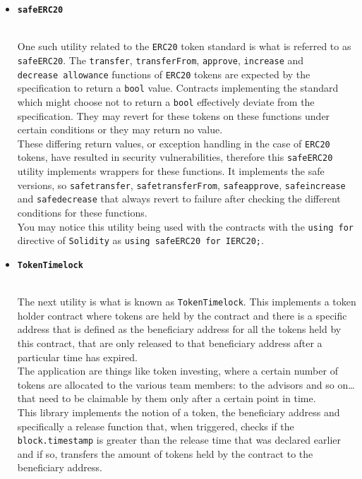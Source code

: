 \begin{itemize}
\item
  \textbf{\texttt{safeERC20}}\strut \\

  One such utility related to the \texttt{ERC20} token standard is what
  is referred to as \texttt{safeERC20}. The \texttt{transfer},
  \texttt{transferFrom}, \texttt{approve}, \texttt{increase} and
  \texttt{decrease\ allowance} functions of \texttt{ERC20} tokens are
  expected by the specification to return a \texttt{bool} value.
  Contracts implementing the standard which might choose not to return a
  \texttt{bool} effectively deviate from the specification. They may
  revert for these tokens on these functions under certain conditions or
  they may return no value.\\

  These differing return values, or exception handling in the case of
  \texttt{ERC20} tokens, have resulted in security vulnerabilities,
  therefore this \texttt{safeERC20} utility implements wrappers for
  these functions. It implements the safe versions, so
  \texttt{safetransfer}, \texttt{safetransferFrom},
  \texttt{safeapprove}, \texttt{safeincrease} and \texttt{safedecrease}
  that always revert to failure after checking the different conditions
  for these functions.\\

  You may notice this utility being used with the contracts with the
  \texttt{using\ for} directive of \texttt{Solidity} as
  \texttt{using\ safeERC20\ for\ IERC20;}.
\item
  \textbf{\texttt{TokenTimelock}}\strut \\

  The next utility is what is known as \texttt{TokenTimelock}. This
  implements a token holder contract where tokens are held by the
  contract and there is a specific address that is defined as the
  beneficiary address for all the tokens held by this contract, that are
  only released to that beneficiary address after a particular time has
  expired.\\

  The application are things like token investing, where a certain
  number of tokens are allocated to the various team members: to the
  advisors and so on\ldots{} that need to be claimable by them only
  after a certain point in time.\\

  This library implements the notion of a token, the beneficiary address
  and specifically a release function that, when triggered, checks if
  the \texttt{block.timestamp} is greater than the release time that was
  declared earlier and if so, transfers the amount of tokens held by the
  contract to the beneficiary address.
\end{itemize}

